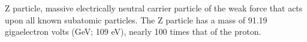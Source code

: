 Z particle, massive electrically neutral carrier particle of the weak force that acts upon all known subatomic particles. The Z particle has a mass of 91.19 gigaelectron volts (GeV; 109 eV), nearly 100 times that of the proton.
